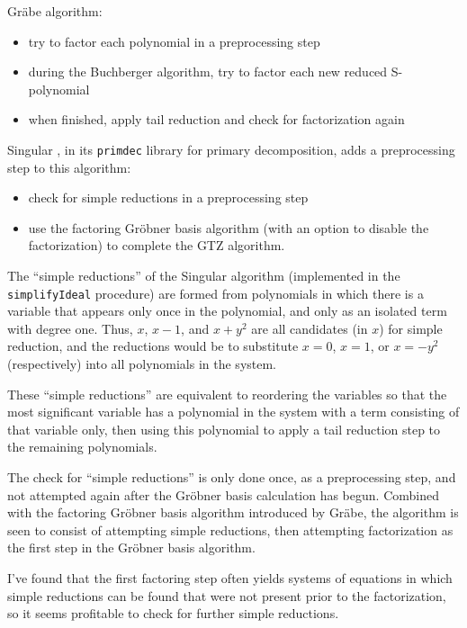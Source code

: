 \documentclass{article}
\begin{document}
Gr\"abe algorithm:

\begin{itemize}
\item try to factor each polynomial in a preprocessing step
\item during the Buchberger algorithm, try to factor each new reduced S-polynomial
\item when finished, apply tail reduction and check for factorization again
\end{itemize}

Singular \cite{DGPS}, in its {\tt primdec} library for primary decomposition,
adds a preprocessing step to this algorithm:

\begin{itemize}
\item check for simple reductions in a preprocessing step
\item use the factoring Gr\"obner basis algorithm (with an option to disable the factorization) to complete the GTZ algorithm.
\end{itemize}

The ``simple reductions'' of the Singular algorithm (implemented in the {\tt simplifyIdeal} procedure)
are formed from polynomials in which
there is a variable that appears only once in the polynomial, and only as an isolated term with degree one.
Thus, $x$, $x-1$, and $x+y^2$ are all candidates (in $x$) for simple reduction, and
the reductions would be to substitute $x=0$, $x=1$, or $x=-y^2$ (respectively) into all
polynomials in the system.

These ``simple reductions'' are equivalent to reordering the variables
so that the most significant variable has a polynomial in
the system with a term consisting of that variable only,
then using this polynomial to apply a tail reduction step to the remaining polynomials.

The check for ``simple reductions'' is only done once, as a preprocessing step,
and not attempted again after the Gr\"obner basis calculation has begun.
Combined with the factoring Gr\"obner basis algorithm introduced by Gr\"abe,
the algorithm is seen to consist of attempting simple reductions, then
attempting factorization as the first step in the Gr\"obner basis algorithm.

I've found that the first factoring step often yields systems of equations in
which simple reductions can be found that were not present prior to
the factorization, so it seems profitable to check for further simple reductions.
\end{document}
